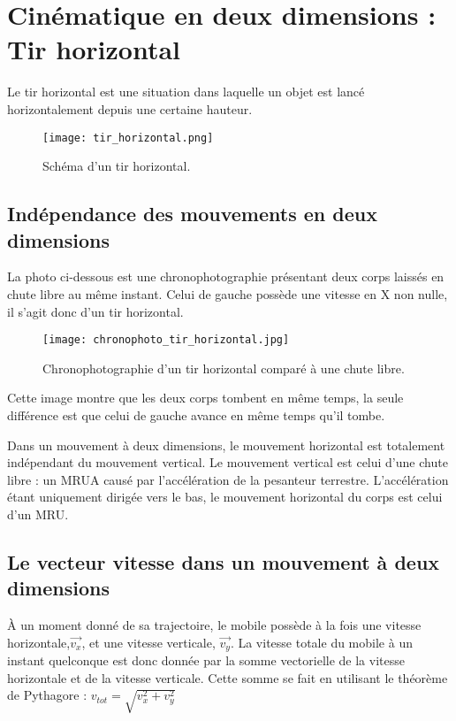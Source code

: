 \chapter{Cinématique en deux dimensions : Tir horizontal}
Le tir horizontal est une situation dans laquelle un objet est lancé horizontalement depuis une certaine hauteur.

\begin{figure}[h!]
    \centering
    \texttt{[image: tir\_horizontal.png]}
    \caption{Schéma d'un tir horizontal.}
    \label{Schéma d'un tir horizontal}
\end{figure}

\section{Indépendance des mouvements en deux dimensions}
La photo ci-dessous est une chronophotographie présentant deux corps laissés en chute libre au même instant. Celui de gauche possède une vitesse en X non nulle, il s'agit donc d'un tir horizontal.
\begin{figure}[h!]
    \centering
    \texttt{[image: chronophoto\_tir\_horizontal.jpg]}
    \caption{Chronophotographie d'un tir horizontal comparé à une chute libre.}
    \label{chronophoto_tir_horizontal}
\end{figure}
Cette image montre que les deux corps tombent en même temps, la seule différence est que celui de gauche avance en même temps qu'il tombe.


\begin{encadre}
    Dans un mouvement à deux dimensions, le mouvement horizontal est totalement indépendant du mouvement vertical. Le mouvement vertical est celui d'une chute libre : un MRUA causé par l'accélération de la pesanteur terrestre.
    L'accélération étant uniquement dirigée vers le bas, le mouvement horizontal du corps est celui d'un MRU.
\end{encadre}

\newpage

\section{Le vecteur vitesse dans un mouvement à deux dimensions}
À un moment donné de sa trajectoire, le mobile possède à la fois une vitesse horizontale,\(\vec{v_x}\), et une vitesse verticale, \(\vec{v_y}\). La vitesse totale du mobile à un instant quelconque est donc donnée par la somme vectorielle de la vitesse horizontale et de la vitesse verticale. Cette somme se fait en utilisant le théorème de Pythagore : \(v_{tot}=\sqrt{v_x ^2 + v_y ^2}\)


